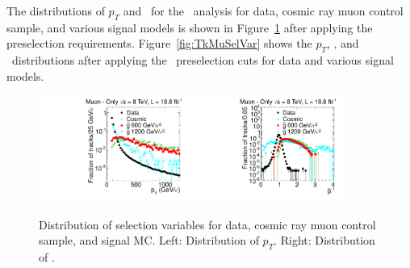 The distributions of $p_T$ and \invbeta\ for the \muononly\ analysis for data, cosmic ray muon control sample, and various signal models is 
shown in Figure~\ref{fig:MuOnlySelVar} after applying the preselection requirements. Figure~\ref{fig:TkMuSelVar} shows the $p_T$, \invbeta, and \dedx\
distributions after applying the \tktof\ preselection cuts for data and various signal models.

\begin{figure}
\centering
  \includegraphics[clip=true, trim=0.0cm 0cm 2.8cm 0cm, width=0.44\textwidth]{figures/muonly/Selection_Comp_8TeV_Cosmic_Pt_BS}
  \includegraphics[clip=true, trim=0.0cm 0cm 2.8cm 0cm, width=0.44\textwidth]{figures/muonly/Selection_Comp_8TeV_Cosmic_TOF_BS} \\
  \caption[Distribution of \invbeta\ and \pt\ in the \muononly\ analysis for data, cosmic ray muon control sample, and signal MC]
{Distribution of selection variables for data, cosmic ray muon control sample, and signal MC.
Left: Distribution of $p_T$. Right: Distribution of \invbeta.}
    \label{fig:MuOnlySelVar}
\end{figure}

